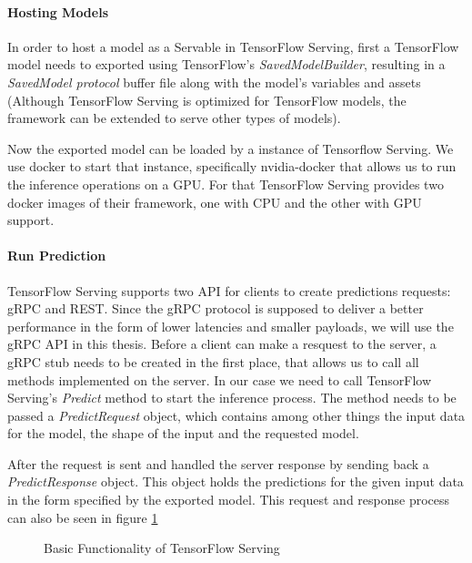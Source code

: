 \paragraph{Hosting Models}
In order to host a model as a Servable in TensorFlow Serving, first a TensorFlow model needs to exported using TensorFlow's \emph{SavedModelBuilder}, resulting in a \emph{SavedModel protocol} buffer file along with the model’s variables and assets (Although TensorFlow Serving is optimized for TensorFlow models, the framework can be extended to serve other types of models).

Now the exported model can be loaded by a instance of Tensorflow Serving.
We use docker to start that instance, specifically nvidia-docker that allows us to run the inference operations on a GPU. For that TensorFlow Serving provides two docker images of their framework, one with CPU and the other with GPU support.

\paragraph{Run Prediction}
TensorFlow Serving supports two API for clients to create predictions requests: gRPC and REST. Since the gRPC protocol is supposed to deliver a better performance in the form of lower latencies and smaller payloads, we will use the gRPC API in this thesis.
Before a client can make a resquest to the server, a gRPC stub needs to be created in the first place, that allows us to call all methods implemented on the server. In our case we need to call TensorFlow Serving's \emph{Predict} method to start the inference process. The method needs to be passed a \emph{PredictRequest} object, which contains among other things the input data for the model, the shape of the input and the requested model.%

After the request is sent and handled the server response by sending back a \emph{PredictResponse} object. This object holds the predictions for the given input data in the form specified by the exported model.
This request and response process can also be seen in figure \ref{fig:cloud}

\begin{figure}[H]
\centering

\caption{Basic Functionality of TensorFlow Serving}
\label{fig:cloud}
\end{figure}
